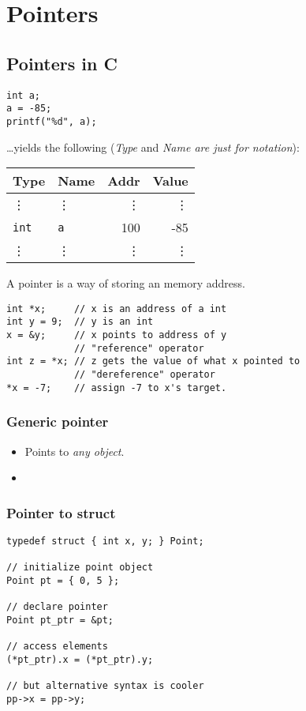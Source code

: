 \chapter{Pointers}
\section{Pointers in C}
\begin{verbatim}
int a;
a = -85;
printf("%d", a);
\end{verbatim}
\ldots yields the following (\emph{Type} and \emph{Name are just for notation}):

\noindent
\begin{tabular}{llrr}
	Type & Name & Addr & Value\\ \hline
	\vdots & \vdots & \vdots & \vdots \\
	\texttt{int} & \texttt{a} & 100 & -85 \\
	\vdots & \vdots & \vdots & \vdots \\
\end{tabular}

A pointer is a way of storing an memory address.

\begin{verbatim}
int *x;     // x is an address of a int
int y = 9;  // y is an int
x = &y;     // x points to address of y
            // "reference" operator
int z = *x; // z gets the value of what x pointed to
            // "dereference" operator
*x = -7;    // assign -7 to x's target.
\end{verbatim}

\subsection{Generic pointer}
\begin{itemize}
	\item Points to \emph{any object}.
	
	\item {}
\end{itemize}

\subsection{Pointer to struct}
\begin{verbatim}
typedef struct { int x, y; } Point;

// initialize point object
Point pt = { 0, 5 };

// declare pointer
Point pt_ptr = &pt;

// access elements
(*pt_ptr).x = (*pt_ptr).y;

// but alternative syntax is cooler
pp->x = pp->y;
\end{verbatim}